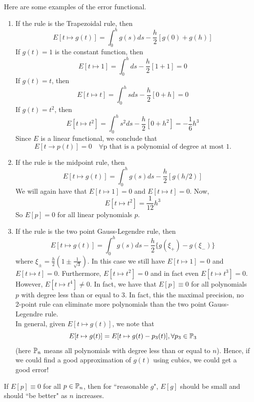 \documentclass{article}
\begin{document}
\begin{example}
    Here are some examples of the error functional.
    \begin{enumerate}
        \item If the rule is the Trapezoidal rule, then
        \[E[t \mapsto g(t)] = \int_0^h g(s) ds - \frac{h}{2} [g(0) + g(h)]\]
        If $g(t) = 1$ is the constant function, then
        \[E[t \mapsto 1] = \int_0^h ds - \frac{h}{2}[1 + 1] = 0\]
        If $g(t) = t$, then
        \[E[t \mapsto t] = \int_0^h s ds - \frac{h}{2}[0 + h] = 0\]
        If $g(t) = t^2$, then
        \[E[t \mapsto t^2] = \int_0^h s^2 ds - \frac{h}{2}[0 + h^2] = -\frac{1}{6} h^3\]
    Since $E$ is a linear functional, we conclude that
    \[E[t \to p(t)] = 0 \quad \forall \text{p that is a polynomial of degree at most $1$.}\]

        \item If the rule is the midpoint rule, then
        \[E[t \mapsto g(t)] = \int_0^h g(s) ds - \frac{h}{2} [g(h/2)]\]
        We will again have that $E[t \mapsto 1] = 0$ and $E[t \mapsto t] = 0$. Now,
        \[E[t \mapsto t^2] = \frac{1}{12} h^{3}\]
        So $E[p] = 0$ for all linear polynomials $p$.

        \item If the rule is the two point Gauss-Legendre rule, then
        \[E[t \mapsto g(t)] = \int_0^h g(s) ds - \frac{h}{2} \{g(\xi_+) - g(\xi_-)\}\]
        where $\xi_{\pm} = \frac{h}{2} (1 \pm \frac{1}{\sqrt{3}})$. In this case we still have $E[t \mapsto 1] = 0$ and $E[t \mapsto t] = 0$. Furthermore, $E[t \mapsto t^2] = 0$ and in fact even $E[t \mapsto t^3] = 0$. However, $E[t \mapsto t^4] \neq 0$. In fact, we have that $E[p] \equiv 0$ for all polynomials $p$ with degree less than or equal to $3$. In fact, this the maximal precision, no 2-point rule can eliminate more polynomials than the two point Gauss-Legendre rule.\\

        In general, given $E[t \mapsto g(t)]$, we note that
        \[E[t \mapsto g(t)] = E[t \mapsto g(t) - p_3(t)], \forall p_3 \in \mathbb{P}_3\]
        (here $\mathbb{P}_n$ means all polynomials with degree less than or equal to $n$). Hence, if we could find a good approximation of $g(t)$ using cubics, we could get a good error!
    \end{enumerate}
\end{example}

\begin{conjecture}
    If $E[p] \equiv 0$ for all $p \in \mathbb{P}_n$, then for ``reasonable $g$", $E[g]$ should be small and should ``be better" as $n$ increases. 
\end{conjecture}
\end{document}
